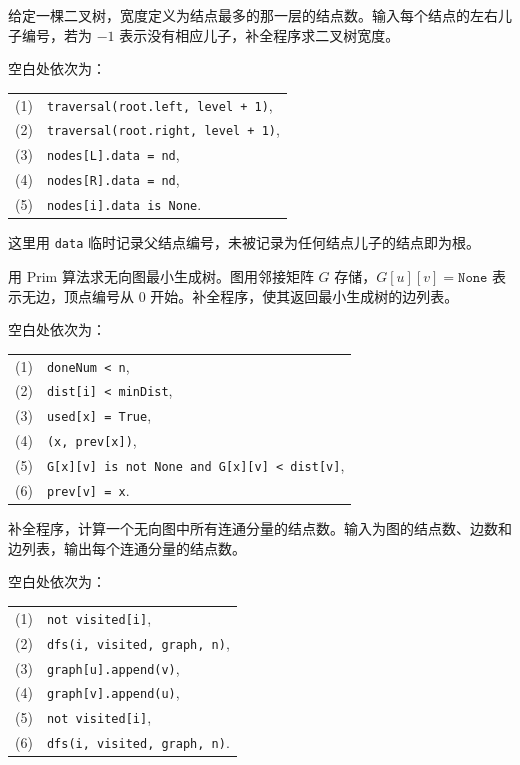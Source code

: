 \begin{question}[二叉树宽度]
给定一棵二叉树，宽度定义为结点最多的那一层的结点数。输入每个结点的左右儿子编号，若为 $-1$ 表示没有相应儿子，补全程序求二叉树宽度。
\begin{solution}
空白处依次为：
\begin{center}
\small
\begin{tabular}{@{}r l@{}}
(1)&\texttt{traversal(root.left, level + 1)},\\
(2)&\texttt{traversal(root.right, level + 1)},\\
(3)&\texttt{nodes[L].data = nd},\\
(4)&\texttt{nodes[R].data = nd},\\
(5)&\texttt{nodes[i].data is None}.
\end{tabular}
\end{center}
这里用 \texttt{data} 临时记录父结点编号，未被记录为任何结点儿子的结点即为根。
\end{solution}
\end{question}

\begin{question}[Prim 算法]
用 Prim 算法求无向图最小生成树。图用邻接矩阵 $G$ 存储，$G[u][v]=\texttt{None}$ 表示无边，顶点编号从 $0$ 开始。补全程序，使其返回最小生成树的边列表。
\begin{solution}
空白处依次为：
\begin{center}
\small
\begin{tabular}{@{}r l@{}}
(1)&\texttt{doneNum < n},\\
(2)&\texttt{dist[i] < minDist},\\
(3)&\texttt{used[x] = True},\\
(4)&\texttt{(x, prev[x])},\\
(5)&\texttt{G[x][v] is not None and G[x][v] < dist[v]},\\
(6)&\texttt{prev[v] = x}.
\end{tabular}
\end{center}
\end{solution}
\end{question}

\begin{question}[连通分量大小]
补全程序，计算一个无向图中所有连通分量的结点数。输入为图的结点数、边数和边列表，输出每个连通分量的结点数。
\begin{solution}
空白处依次为：
\begin{center}
\small
\begin{tabular}{@{}r l@{}}
(1)&\texttt{not visited[i]},\\
(2)&\texttt{dfs(i, visited, graph, n)},\\
(3)&\texttt{graph[u].append(v)},\\
(4)&\texttt{graph[v].append(u)},\\
(5)&\texttt{not visited[i]},\\
(6)&\texttt{dfs(i, visited, graph, n)}.
\end{tabular}
\end{center}
\end{solution}
\end{question}
